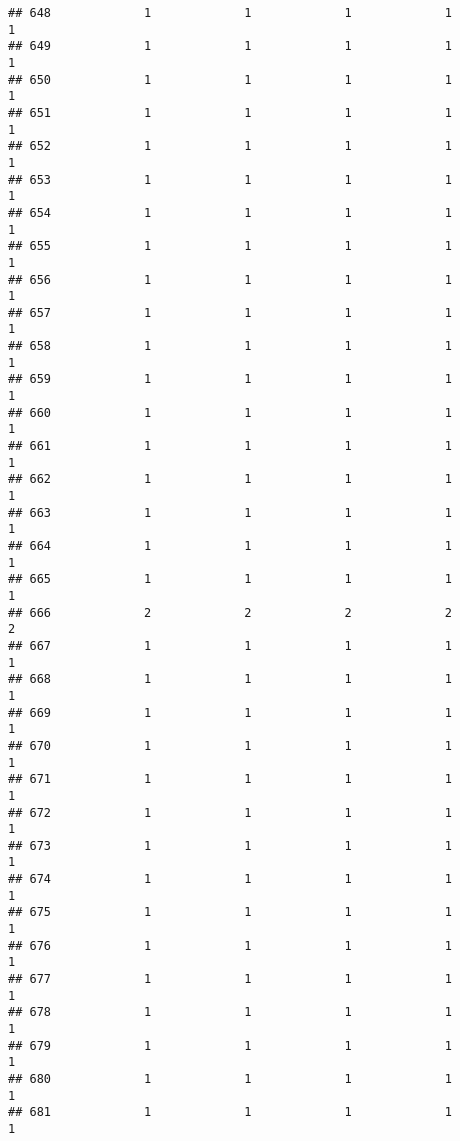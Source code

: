 \documentclass[
]{article}
\begin{document}
\begin{verbatim}
## 648             1             1             1             1             1
## 649             1             1             1             1             1
## 650             1             1             1             1             1
## 651             1             1             1             1             1
## 652             1             1             1             1             1
## 653             1             1             1             1             1
## 654             1             1             1             1             1
## 655             1             1             1             1             1
## 656             1             1             1             1             1
## 657             1             1             1             1             1
## 658             1             1             1             1             1
## 659             1             1             1             1             1
## 660             1             1             1             1             1
## 661             1             1             1             1             1
## 662             1             1             1             1             1
## 663             1             1             1             1             1
## 664             1             1             1             1             1
## 665             1             1             1             1             1
## 666             2             2             2             2             2
## 667             1             1             1             1             1
## 668             1             1             1             1             1
## 669             1             1             1             1             1
## 670             1             1             1             1             1
## 671             1             1             1             1             1
## 672             1             1             1             1             1
## 673             1             1             1             1             1
## 674             1             1             1             1             1
## 675             1             1             1             1             1
## 676             1             1             1             1             1
## 677             1             1             1             1             1
## 678             1             1             1             1             1
## 679             1             1             1             1             1
## 680             1             1             1             1             1
## 681             1             1             1             1             1

\end{verbatim}
\end{document}

